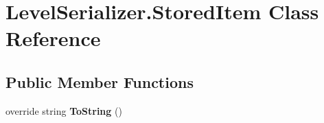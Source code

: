 \hypertarget{class_level_serializer_1_1_stored_item}{}\section{Level\+Serializer.\+Stored\+Item Class Reference}
\label{class_level_serializer_1_1_stored_item}
\subsection*{Public Member Functions}
\begin{DoxyCompactItemize}
\item 
\mbox{\label{class_level_serializer_1_1_stored_item_acf053f24c30be3c60e52ef10581770d0}} 
override string {\bfseries To\+String} ()
\end{DoxyCompactItemize}
